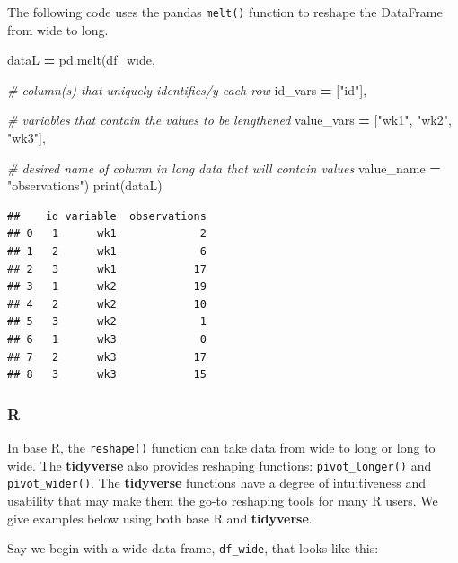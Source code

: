\documentclass[
]{book}
\newenvironment{Shaded}{\begin{snugshade}}{\end{snugshade}}
\newcommand{\BuiltInTok}[1]{#1}
\newcommand{\CommentTok}[1]{\textcolor[rgb]{0.56,0.35,0.01}{\textit{#1}}}
\newcommand{\NormalTok}[1]{#1}
\newcommand{\OperatorTok}[1]{\textcolor[rgb]{0.81,0.36,0.00}{\textbf{#1}}}
\newcommand{\StringTok}[1]{\textcolor[rgb]{0.31,0.60,0.02}{#1}}
\begin{document}
The following code uses the pandas \texttt{melt()} function to reshape the DataFrame from wide to long.

\begin{Shaded}
\begin{Highlighting}[]
\NormalTok{dataL }\OperatorTok{=}\NormalTok{ pd.melt(df\_wide,}

                \CommentTok{\# column(s) that uniquely identifies/y each row}
\NormalTok{                id\_vars }\OperatorTok{=}\NormalTok{ [}\StringTok{"id"}\NormalTok{],}
                
                \CommentTok{\# variables that contain the values to be lengthened}
\NormalTok{                value\_vars }\OperatorTok{=}\NormalTok{ [}\StringTok{"wk1"}\NormalTok{, }\StringTok{"wk2"}\NormalTok{, }\StringTok{"wk3"}\NormalTok{],}
                
                \CommentTok{\# desired name of column in long data that will contain values}
\NormalTok{                value\_name }\OperatorTok{=} \StringTok{"observations"}\NormalTok{)}
\BuiltInTok{print}\NormalTok{(dataL)}
\end{Highlighting}
\end{Shaded}

\begin{verbatim}
##    id variable  observations
## 0   1      wk1             2
## 1   2      wk1             6
## 2   3      wk1            17
## 3   1      wk2            19
## 4   2      wk2            10
## 5   3      wk2             1
## 6   1      wk3             0
## 7   2      wk3            17
## 8   3      wk3            15
\end{verbatim}

\hypertarget{r-32}{%
\subsubsection*{R}\label{r-32}}

In base R, the \texttt{reshape()} function can take data from wide to long or long to wide. The \textbf{tidyverse} also provides reshaping functions: \texttt{pivot\_longer()} and \texttt{pivot\_wider()}. The \textbf{tidyverse} functions have a degree of intuitiveness and usability that may make them the go-to reshaping tools for many R users. We give examples below using both base R and \textbf{tidyverse}.

Say we begin with a wide data frame, \texttt{df\_wide}, that looks like this:
\end{document}
